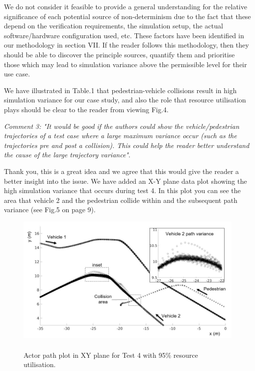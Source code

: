 \documentclass[11pt, a4paper]{letter} %
\begin{document}
\begin{letter}
We do not consider it feasible to provide a general understanding for the relative significance of each potential source of non-determinism due to the fact that these depend on the verification requirements, the simulation setup, the actual software/hardware configuration used, etc. These factors have been identified in our methodology in section VII. If the reader follows this methodology, then they should be able to discover the principle sources, quantify them and prioritise those which may lead to simulation variance above the permissible level for their use case.

We have illustrated in Table.1 that pedestrian-vehicle collisions result in high simulation variance for our case study, and also the role that resource utilisation plays should be clear to the reader from viewing Fig.4.


\bigskip

\textit{Comment 3: "It would be good if the authors could show the vehicle/pedestrian trajectories of a test case where a large maximum variance occur (such as the trajectories pre and post a collision). This could help the reader better understand the cause of the large trajectory variance"}.

Thank you, this is a great idea and we agree that this would give the reader a better insight into the issue. We have added an X-Y plane data plot showing the high simulation variance that occurs during test 4. In this plot you can see the area that vehicle 2 and the pedestrian collide within and the subsequent path variance (see Fig.5 on page 9). 

\begin{figure}
    \centering
    \includegraphics[width=12cm]{../document/other/figures/actor_path_plot.jpg}
    \caption{\\Actor path plot in XY plane for Test 4 with 95\% resource utilisation.}
\end{figure}



\end{letter}
\end{document}
